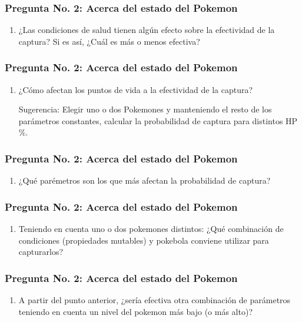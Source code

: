 \documentclass[aspectratio=169]{beamer}
\begin{document}
\begin{frame}
\frametitle{Pregunta No. 2: Acerca del estado del Pokemon}

\begin{enumerate}[label=\emph{\alph*}), series=l_after]
\item ¿Las condiciones de salud tienen algún efecto sobre la efectividad de la captura? Si
es así, ¿Cuál es más o menos efectiva?
\end{enumerate}
\end{frame}
\begin{frame}
\frametitle{Pregunta No. 2: Acerca del estado del Pokemon}

\begin{enumerate}[label=\emph{\alph*}), resume*=l_after]
\item ¿Cómo afectan los puntos de vida a la efectividad de la captura?

\vspace{.5mm}
Sugerencia: Elegir uno o dos Pokemones y manteniendo el resto de los parámetros constantes, calcular la probabilidad de captura para distintos HP \%.
\end{enumerate}
\end{frame}
\begin{frame}
\frametitle{Pregunta No. 2: Acerca del estado del Pokemon}

\begin{enumerate}[label=\emph{\alph*}), resume*=l_after]
\item ¿Qué parémetros son los que más afectan la probabilidad de captura?
\end{enumerate}
\end{frame}
\begin{frame}
\frametitle{Pregunta No. 2: Acerca del estado del Pokemon}

\begin{enumerate}[label=\emph{\alph*}), resume*=l_after]
\item Teniendo en cuenta uno o dos pokemones distintos: ¿Qué combinación de condiciones (propiedades mutables) y pokebola conviene utilizar para capturarlos?
\end{enumerate}
\end{frame}
\begin{frame}
\frametitle{Pregunta No. 2: Acerca del estado del Pokemon}

\begin{enumerate}[label=\emph{\alph*}), resume*=l_after]
\item  A partir del punto anterior, ¿sería efectiva otra combinación de parámetros teniendo en cuenta un nivel del pokemon más bajo (o más alto)?
\end{enumerate}
\end{frame}
\end{document}
